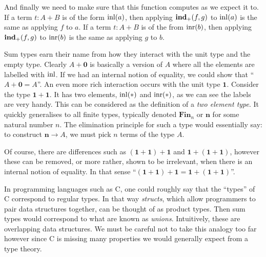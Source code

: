 \begin{defin}
    And finally we need to make sure that this function computes as we expect it to. If a term $t : A + B$ is of the form $\inl(a)$, then applying $\indp(f, g)$ to $\inl(a)$ is the same as applying $f$ to $a$. If a term $t : A + B$ is of the from $\inr(b)$, then applying $\indp (f, g)$ to $\inr (b)$ is the same as applying $g$ to $b$.

    \begin{prooftree}
    \end{prooftree}

    \begin{prooftree}
    \end{prooftree}
\end{defin}

Sum types earn their name from how they interact with the unit type and the empty type. Clearly $A + \mathbf{0}$ is basically a version of $A$ where all the elements are labelled with $\inl$. If we had an internal notion of equality, we could show that ``$A + \mathbf{0} = A$''. An even more rich interaction occurs with the unit type $\mathbf{1}$. Consider the type $\mathbf{1} + \mathbf{1}$. It has two elements, $\inl(*)$ and $\inr(*)$, as we can see the labels are very handy. This can be considered as the definition of a \emph{two element type}. It quickly generalises to all finite types, typically denoted $\mathbf{Fin}_n$ or $\mathbf{n}$ for some natural number $n$.
The elimination principle for such a type would essentially say: to construct $\mathbf{n} \to A$, we must pick $n$ terms of the type $A$.

Of course, there are differences such as $(\mathbf{1} + \mathbf{1}) + \mathbf{1}$ and $\mathbf{1} + (\mathbf{1} + \mathbf{1})$, however these can be removed, or more rather, shown to be irrelevant, when there is an internal notion of equality. In that sense ``$(\mathbf{1} + \mathbf{1}) + \mathbf{1} = \mathbf{1} + (\mathbf{1} + \mathbf{1})$''.

\begin{remark}
    In programming languages such as C, one could roughly say that the ``types'' of C correspond to regular types. In that way \emph{structs}, which allow programmers to pair data structures together, can be thought of as product types. Then sum types would correspond to what are known as \emph{unions}. Intuitively, these are overlapping data structures. We must be careful not to take this analogy too far however since C is missing many properties we would generally expect from a type theory.
\end{remark}


